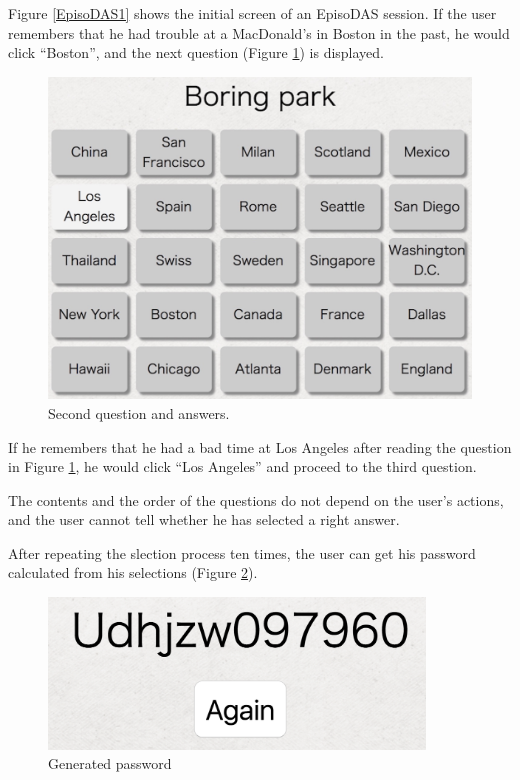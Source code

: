 \documentclass[sigconf]{acmart}
\begin{document}
Figure \ref{EpisoDAS1} shows
the initial screen of an EpisoDAS session.
%
If the user remembers that he had trouble at a MacDonald's in Boston in the past,
he would click ``Boston'', and the next question (Figure \ref{EpisoDAS2}) is displayed.

\begin{figure}[H]
  \includegraphics[width=12cm,bb=0 0 1396 1062]{figures/EpisoDAS2.jpg}
  \caption{Second question and answers.}
  \label{EpisoDAS2}
\end{figure}

If he remembers that he had a bad time at Los Angeles
after reading the question in Figure \ref{EpisoDAS2},
he would click ``Los Angeles'' and proceed to the third question.

The contents and the order of the questions
do not depend on the user's actions, and
the user cannot tell whether he has selected a right answer.

After repeating the slection process ten times,
the user can get his password
calculated from his selections (Figure \ref{Result}).

\begin{figure}[H]
  \includegraphics[width=10cm,bb=0 0 1160 468]{figures/result.png}
  \caption{Generated password}
  \label{Result}
\end{figure}
\end{document}
